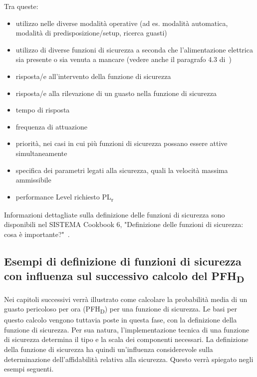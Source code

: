 Tra queste:
\begin{itemize}
    \item utilizzo nelle diverse modalità operative (ad es. modalità automatica, modalità di predisposizione/setup, ricerca guasti) 
    \item utilizzo di diverse funzioni di sicurezza a seconda che l'alimentazione elettrica sia presente o sia venuta a mancare (vedere anche il paragrafo 4.3 di~\cite{werner2019}) 
    \item risposta/e all'intervento della funzione di sicurezza 
    \item risposta/e alla rilevazione di un guasto nella funzione di sicurezza 
    \item tempo di risposta 
    \item frequenza di attuazione 
    \item priorità, nei casi in cui più funzioni di sicurezza possano essere attive simultaneamente
    \item specifica dei parametri legati alla sicurezza, quali la velocità massima ammissibile
    \item performance Level richiesto PL\textsubscript{\small r}
\end{itemize}

Informazioni dettagliate sulla definizione delle funzioni di sicurezza sono disponibili nel SISTEMA Cookbook 6, "Definizione delle funzioni di sicurezza: cosa è importante?"~\cite{cookbook6}.

\subsection{Esempi di definizione di funzioni di sicurezza con influenza sul successivo calcolo del \texorpdfstring{PFH\textsubscript{\small D}}{PFHD}}
\label{subsec:05-3-2}
Nei capitoli successivi verrà illustrato come calcolare la probabilità media di un guasto pericoloso per ora (PFH\textsubscript{D}) per una funzione di sicurezza. Le basi per questo calcolo vengono tuttavia poste in questa fase, con la definizione della funzione di sicurezza. Per sua natura, l'implementazione tecnica di una funzione di sicurezza determina il tipo e la scala dei componenti necessari. La definizione della funzione di sicurezza ha quindi un'influenza considerevole sulla determinazione dell'affidabilità relativa alla sicurezza. Questo verrà spiegato negli esempi seguenti.

